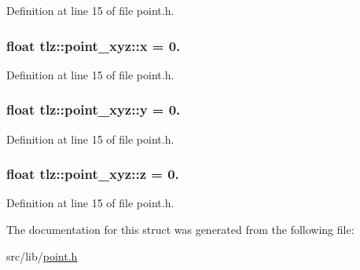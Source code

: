 Definition at line 15 of file point.\+h.

\subsubsection[{\texorpdfstring{x}{x}}]{\setlength{\rightskip}{0pt plus 5cm}float tlz\+::point\+\_\+xyz\+::x = 0.}\hypertarget{structtlz_1_1point__xyz_a47013757d20b2741b50258abe2204a6f}{}\label{structtlz_1_1point__xyz_a47013757d20b2741b50258abe2204a6f}


Definition at line 15 of file point.\+h.

\subsubsection[{\texorpdfstring{y}{y}}]{\setlength{\rightskip}{0pt plus 5cm}float tlz\+::point\+\_\+xyz\+::y = 0.}\hypertarget{structtlz_1_1point__xyz_a6ecb1c5ddf0309705b611ec7b06805fd}{}\label{structtlz_1_1point__xyz_a6ecb1c5ddf0309705b611ec7b06805fd}


Definition at line 15 of file point.\+h.

\subsubsection[{\texorpdfstring{z}{z}}]{\setlength{\rightskip}{0pt plus 5cm}float tlz\+::point\+\_\+xyz\+::z = 0.}\hypertarget{structtlz_1_1point__xyz_abf72b22ed673b4f3619a279df5ddae08}{}\label{structtlz_1_1point__xyz_abf72b22ed673b4f3619a279df5ddae08}


Definition at line 15 of file point.\+h.



The documentation for this struct was generated from the following file\+:\begin{DoxyCompactItemize}
\item 
src/lib/\hyperlink{point_8h}{point.\+h}\end{DoxyCompactItemize}
